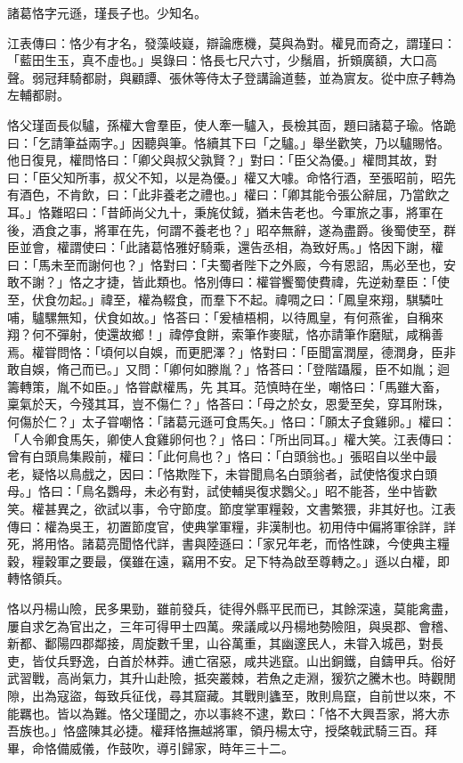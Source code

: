
\begin{pinyinscope}
諸葛恪字元遜，瑾長子也。少知名。

江表傳曰：恪少有才名，發藻岐嶷，辯論應機，莫與為對。權見而奇之，謂瑾曰：「藍田生玉，真不虛也。」吳錄曰：恪長七尺六寸，少鬚眉，折頞廣額，大口高聲。弱冠拜騎都尉，與顧譚、張休等侍太子登講論道藝，並為賔友。從中庶子轉為左輔都尉。

恪父瑾靣長似驢，孫權大會羣臣，使人牽一驢入，長檢其靣，題曰諸葛子瑜。恪跪曰：「乞請筆益兩字。」因聽與筆。恪續其下曰「之驢。」舉坐歡笑，乃以驢賜恪。他日復見，權問恪曰：「卿父與叔父孰賢？」對曰：「臣父為優。」權問其故，對曰：「臣父知所事，叔父不知，以是為優。」權又大噱。命恪行酒，至張昭前，昭先有酒色，不肯飲，曰：「此非養老之禮也。」權曰：「卿其能令張公辭屈，乃當飲之耳。」恪難昭曰：「昔師尚父九十，秉旄仗鉞，猶未告老也。今軍旅之事，將軍在後，酒食之事，將軍在先，何謂不養老也？」昭卒無辭，遂為盡爵。後蜀使至，群臣並會，權謂使曰：「此諸葛恪雅好騎乘，還告丞相，為致好馬。」恪因下謝，權曰：「馬未至而謝何也？」恪對曰：「夫蜀者陛下之外廄，今有恩詔，馬必至也，安敢不謝？」恪之才捷，皆此類也。恪別傳曰：權甞饗蜀使費禕，先逆勑羣臣：「使至，伏食勿起。」禕至，權為輟食，而羣下不起。禕啁之曰：「鳳皇來翔，騏驎吐哺，驢騾無知，伏食如故。」恪荅曰：「爰植梧桐，以待鳳皇，有何燕雀，自稱來翔？何不彈射，使還故鄉！」禕停食餅，索筆作麥賦，恪亦請筆作磨賦，咸稱善焉。權甞問恪：「頃何以自娛，而更肥澤？」恪對曰：「臣聞富潤屋，德潤身，臣非敢自娛，脩己而已。」又問：「卿何如滕胤？」恪荅曰：「登階躡履，臣不如胤；迴籌轉策，胤不如臣。」恪甞獻權馬，先𨪕其耳。范慎時在坐，嘲恪曰：「馬雖大畜，稟氣於天，今殘其耳，豈不傷仁？」恪荅曰：「母之於女，恩愛至矣，穿耳附珠，何傷於仁？」太子甞嘲恪：「諸葛元遜可食馬矢。」恪曰：「願太子食雞卵。」權曰：「人令卿食馬矢，卿使人食雞卵何也？」恪曰：「所出同耳。」權大笑。江表傳曰：曾有白頭鳥集殿前，權曰：「此何鳥也？」恪曰：「白頭翁也。」張昭自以坐中最老，疑恪以鳥戲之，因曰：「恪欺陛下，未甞聞鳥名白頭翁者，試使恪復求白頭母。」恪曰：「鳥名鸚母，未必有對，試使輔吳復求鸚父。」昭不能荅，坐中皆歡笑。權甚異之，欲試以事，令守節度。節度掌軍糧穀，文書繁猥，非其好也。江表傳曰：權為吳王，初置節度官，使典掌軍糧，非漢制也。初用侍中偏將軍徐詳，詳死，將用恪。諸葛亮聞恪代詳，書與陸遜曰：「家兄年老，而恪性踈，今使典主糧穀，糧穀軍之要最，僕雖在遠，竊用不安。足下特為啟至尊轉之。」遜以白權，即轉恪領兵。

恪以丹楊山險，民多果勁，雖前發兵，徒得外縣平民而已，其餘深遠，莫能禽盡，屢自求乞為官出之，三年可得甲士四萬。衆議咸以丹楊地勢險阻，與吳郡、會稽、新都、鄱陽四郡鄰接，周旋數千里，山谷萬重，其幽邃民人，未甞入城邑，對長吏，皆仗兵野逸，白首於林莽。逋亡宿惡，咸共逃竄。山出銅鐵，自鑄甲兵。俗好武習戰，高尚氣力，其升山赴險，抵突叢棘，若魚之走淵，猨狖之騰木也。時觀閒隙，出為寇盜，每致兵征伐，尋其窟藏。其戰則蠭至，敗則鳥竄，自前世以來，不能羈也。皆以為難。恪父瑾聞之，亦以事終不逮，歎曰：「恪不大興吾家，將大赤吾族也。」恪盛陳其必捷。權拜恪撫越將軍，領丹楊太守，授棨戟武騎三百。拜畢，命恪備威儀，作鼓吹，導引歸家，時年三十二。


\end{pinyinscope}
